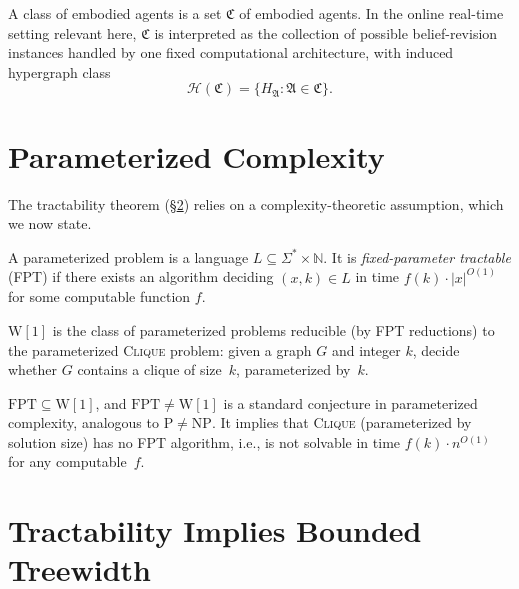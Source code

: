 \documentclass[runningheads]{llncs}
\begin{document}
\begin{definition}\label{def:agent-class}
A class of embodied agents is a set $\mathfrak{C}$ of embodied agents. In the online real-time setting relevant here, $\mathfrak{C}$ is interpreted as the collection of possible belief-revision instances handled by one fixed computational architecture, with induced hypergraph class
\[
  \mathcal{H}(\mathfrak{C}) = \{ H_{\mathfrak{A}} : \mathfrak{A} \in \mathfrak{C} \}.
\]
\end{definition}

\section{Parameterized Complexity}\label{sec:complexity}

The tractability theorem (\S\ref{sec:tractability}) relies on a complexity-theoretic assumption, which we now state.

\begin{definition}\label{def:fpt}
A parameterized problem is a language $L \subseteq \Sigma^* \times \mathbb{N}$.
It is \emph{fixed-parameter tractable} (FPT) if there exists an algorithm deciding $(x, k) \in L$ in time $f(k) \cdot |x|^{O(1)}$ for some computable function $f$.
\end{definition}

\begin{definition}[{$\mathrm{W}[1]$}]\label{def:w1}
$\mathrm{W}[1]$ is the class of parameterized problems reducible (by FPT reductions) to the parameterized \textsc{Clique} problem: given a graph $G$ and integer $k$, decide whether $G$ contains a clique of size~$k$, parameterized by~$k$.
\end{definition}

\begin{remark}\label{rem:fpt-conj}
$\mathrm{FPT} \subseteq \mathrm{W}[1]$, and $\mathrm{FPT} \neq \mathrm{W}[1]$ is a standard conjecture in parameterized complexity, analogous to $\mathrm{P} \neq \mathrm{NP}$.
It implies that \textsc{Clique} (parameterized by solution size) has no FPT algorithm, i.e., is not solvable in time $f(k) \cdot n^{O(1)}$ for any computable~$f$.
\end{remark}

\section{Tractability Implies Bounded Treewidth}\label{sec:tractability}
\end{document}
